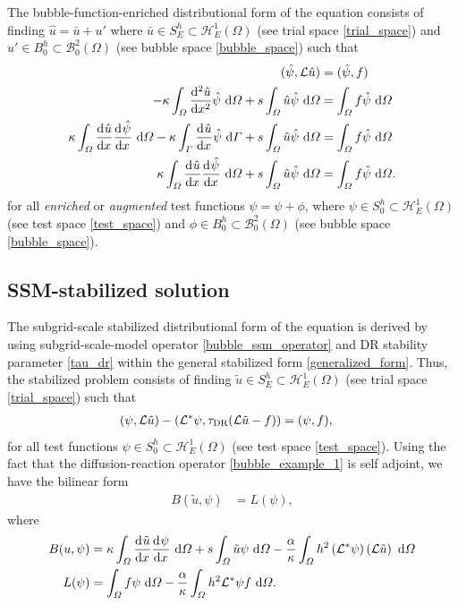 The bubble-function-enriched distributional form of the equation consists of finding $\hat{u} = \bar{u} + u'$ where $\bar{u} \in S_E^h \subset \mathcal{H}_E^1(\Omega)$ (see trial space \cref{trial_space}) and $u' \in B_0^h \subset \mathcal{B}_0^2(\Omega)$ (see bubble space \cref{bubble_space}) such that
\begin{align*}
  (\hat{\psi}, \Lu \hat{u}) &= (\hat{\psi}, f) \\
  -\kappa \int_{\Omega} \totder[2]{\hat{u}}{x} \hat{\psi} \d{\Omega} + s\int_{\Omega} \hat{u} \hat{\psi} \d{\Omega} &= \int_{\Omega} f \hat{\psi} \d{\Omega} \\
  \kappa \int_{\Omega} \totder{\hat{u}}{x} \totder{\hat{\psi}}{x} \d{\Omega} - \kappa \int_{\Gamma} \totder{\hat{u}}{x} \hat{\psi} \d{\Gamma} + s\int_{\Omega} \hat{u} \hat{\psi} \d{\Omega} &= \int_{\Omega} f \hat{\psi} \d{\Omega} \\
  \kappa \int_{\Omega} \totder{\hat{u}}{x} \totder{\hat{\psi}}{x} \d{\Omega} + s\int_{\Omega} \hat{u} \hat{\psi} \d{\Omega} &= \int_{\Omega} f \hat{\psi} \d{\Omega}.
\end{align*}
for all \emph{enriched} or \emph{augmented} test functions $\hat{\psi} = \psi + \phi$, where $\psi \in S_0^h \subset \mathcal{H}_E^1(\Omega)$ (see test space \cref{test_space}) and $\phi \in B_0^h \subset \mathcal{B}_0^2(\Omega)$ (see bubble space \cref{bubble_space}).

\subsection{SSM-stabilized solution}

The subgrid-scale stabilized distributional form of the equation is derived by using subgrid-scale-model operator \cref{bubble_ssm_operator} and DR stability parameter \cref{tau_dr} within the general stabilized form \cref{generalized_form}.  Thus, the stabilized problem consists of finding $\tilde{u} \in S_E^h \subset \mathcal{H}_E^1(\Omega)$ (see trial space \cref{trial_space}) such that
\begin{align*}
  (\psi, \Lu \tilde{u}) - (\Lu^* \psi, \tau_{\text{DR}} (\Lu \tilde{u} - f)) &= (\psi, f),
\end{align*}
for all test functions $\psi \in S_0^h \subset \mathcal{H}_E^1(\Omega)$ (see test space \cref{test_space}).  Using the fact that the diffusion-reaction operator \cref{bubble_example_1} is self adjoint, we have the bilinear form
\begin{align*}
  B(\tilde{u},\psi) &= L(\psi),
\end{align*}
where
{\footnotesize
\begin{align*} 
  B(u,\psi) &= \kappa \int_{\Omega} \totder{\tilde{u}}{x} \totder{\psi}{x} \d{\Omega} + s\int_{\Omega} \tilde{u} \psi \d{\Omega} - \frac{\alpha}{\kappa} \int_{\Omega} h^2 \left( \Lu^* \psi \right) \left( \Lu \tilde{u} \right) \d{\Omega} \\
  L(\psi) &= \int_{\Omega} f \psi \d{\Omega} - \frac{\alpha}{\kappa} \int_{\Omega} h^2 \Lu^* \psi f \d{\Omega}.
\end{align*}}


